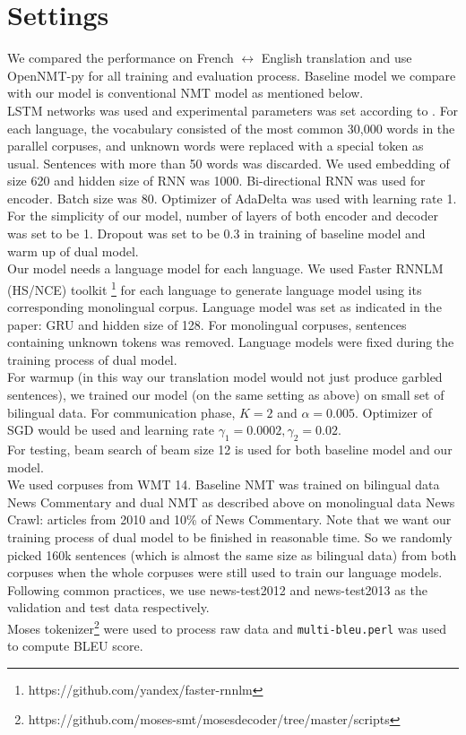 \documentclass[11pt]{article}
\begin{document}
{\part{Settings}
We compared the performance on French $\leftrightarrow$ English translation and use OpenNMT-py for all training and evaluation process. Baseline model we compare with our model is conventional NMT model as mentioned below.
\\
\newline
\indent LSTM networks was used and experimental parameters was set according to \cite{bahdanau2014neural}. For each language, the vocabulary consisted of the most common 30,000 words in the parallel corpuses, and unknown words were replaced with a special token as usual.  Sentences with more than 50 words was discarded. We used embedding of size 620 and hidden size of RNN was 1000. Bi-directional RNN was used for encoder. Batch size was 80. Optimizer of AdaDelta was used with learning rate 1. For the simplicity of our model, number of layers of both encoder and decoder was set to be 1. Dropout was set to be 0.3 in training of baseline model and warm up of dual model.
\\
\newline
\indent Our model needs a language model for each language. We used Faster RNNLM (HS/NCE) toolkit \footnote{https://github.com/yandex/faster-rnnlm}\cite{mikolov2010recurrent} for each language to generate language model using its corresponding monolingual corpus. Language model was set as indicated in the paper: GRU and hidden size of 128. For monolingual corpuses, sentences containing unknown tokens was removed. Language models were fixed during the training process of dual model.
\\
\newline
\indent For warmup (in this way our translation model would not just produce garbled sentences), we trained our model (on the same setting as above) on small set of bilingual data. For communication phase, $K=2$ and $\alpha = 0.005$. Optimizer of SGD would be used and learning rate $\gamma_1 = 0.0002, \gamma_2=0.02$.
\\
\newline
\indent For testing, beam search of beam size 12 is used for both baseline model and our model.
\\
\newline
\indent We used corpuses from WMT 14. Baseline NMT was trained on bilingual data News Commentary and dual NMT as described above on monolingual data News Crawl: articles from 2010 and 10\% of News Commentary. Note that we want our training process of dual model to be finished in reasonable time. So we randomly picked 160k sentences (which is almost the same size as bilingual data) from both corpuses when the whole corpuses were still used to train our language models. Following common practices, we use news-test2012 and news-test2013 as the validation and test data respectively.
\\
\newline
\indent Moses tokenizer\footnote{https://github.com/moses-smt/mosesdecoder/tree/master/scripts} were used to process raw data and \texttt{multi-bleu.perl} was used to compute BLEU score.

}
\end{document}
